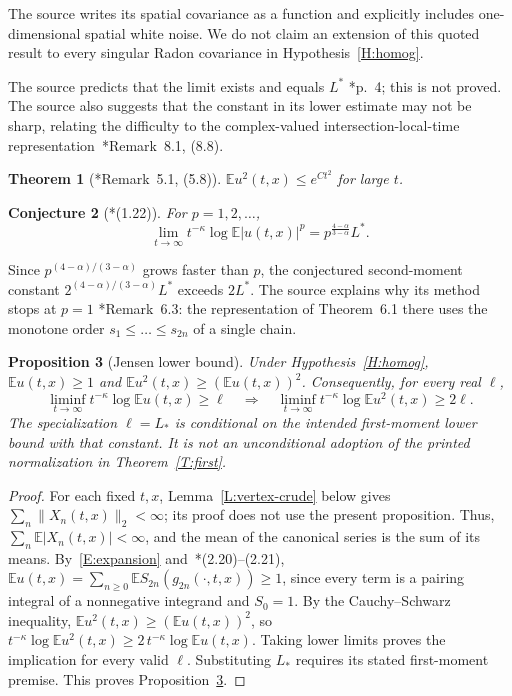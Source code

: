 \documentclass[12pt,oneside,openany]{book}
\numberwithin{equation}{section}
\newtheorem{theorem}{Theorem}[section]
\newtheorem{proposition}[theorem]{Proposition}
\newtheorem{conjecture}[theorem]{Conjecture}
\theoremstyle{nogostyle}
\theoremstyle{definition}
\newcommand{\E}{\mathbb{E}}
\begin{document}
The source writes its spatial covariance as a function and explicitly includes
one-dimensional spatial white noise. We do not claim an extension of this
quoted result to every singular Radon covariance in Hypothesis~\ref{H:homog}.

The source predicts that the limit exists and equals $L^*$
\cite{chen:author2026:time-dependency}*{p.~4}; this is not proved.
The source also suggests that the constant in its lower estimate may not be
sharp, relating the difficulty to the complex-valued intersection-local-time
representation~\cite{chen:author2026:time-dependency}*{Remark~8.1, (8.8)}.

\begin{theorem}[\cite{chen:author2026:time-dependency}*{Remark~5.1, (5.8)}]\label{T:crude}
  $\E u^2(t,x) \le e^{Ct^2}$ for large $t$.
\end{theorem}

\begin{conjecture}[\cite{chen:author2026:time-dependency}*{(1.22)}]\label{Conj:allp}
  For $p = 1,2,\dots$,
  \[
    \lim_{t\to\infty}t^{-\kappa}\log\E|u(t,x)|^p
    =p^{\frac{4-\alpha}{3-\alpha}}L^*.
  \]
\end{conjecture}

Since $p^{(4-\alpha)/(3-\alpha)}$ grows faster than $p$, the conjectured
second-moment constant $2^{(4-\alpha)/(3-\alpha)}L^*$ exceeds $2L^*$. The source
explains why its method stops at $p = 1$
\cite{chen:author2026:time-dependency}*{Remark~6.3}: the representation of
Theorem~6.1 there uses the monotone order $s_1 \le \dots \le s_{2n}$ of a single
chain.

\begin{proposition}[Jensen lower bound]\label{P:Jensen}
  Under Hypothesis~\ref{H:homog}, $\E u(t,x) \ge 1$ and $\E u^2(t,x) \ge (\E
  u(t,x))^2$. Consequently, for every real $\ell$,
  \[
    \liminf_{t\to\infty}t^{-\kappa}\log\E u(t,x)\ge\ell
    \quad\Longrightarrow\quad
    \liminf_{t\to\infty}t^{-\kappa}\log\E u^2(t,x)\ge2\ell.
  \]
  The specialization $\ell = L_*$ is conditional on the intended first-moment
  lower bound with that constant. It is not an unconditional adoption of the
  printed normalization in Theorem~\ref{T:first}.
\end{proposition}

\begin{proof}
  For each fixed $t,x$, Lemma~\ref{L:vertex-crude} below gives
  $\sum_n\|X_n(t,x)\|_2 < \infty$; its proof does not use the present
  proposition. Thus, $\sum_n\E|X_n(t,x)| < \infty$, and the mean of the
  canonical series is the sum of its means. By~\eqref{E:expansion}
  and~\cite{chen:author2026:time-dependency}*{(2.20)--(2.21)}, $\E u(t,x) =
  \sum_{n\ge0}\E S_{2n}(g_{2n}(\cdot,t,x)) \ge 1$, since every term is a pairing
  integral of a nonnegative integrand and $S_0 = 1$. By the Cauchy--Schwarz
  inequality, $\E u^2(t,x) \ge (\E u(t,x))^2$, so $t^{-\kappa}\log\E u^2(t,x)
  \ge 2\,t^{-\kappa}\log\E u(t,x)$. Taking lower limits proves the implication
  for every valid $\ell$. Substituting $L_*$ requires its stated first-moment
  premise. This proves Proposition~\ref{P:Jensen}.
\end{proof}
\end{document}
